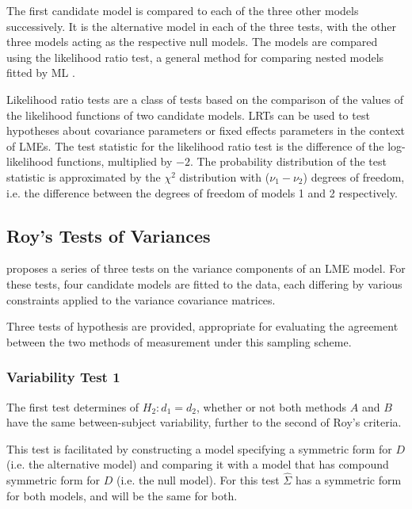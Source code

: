 \documentclass[12pt, a4paper]{report}
\theoremstyle{plain}
\theoremstyle{definition}
\theoremstyle{remark}
\begin{document}
The first candidate model is compared to each of the three other models successively. It is the alternative model in each of the three tests, with the other three models acting as the respective null models. The models are compared using the likelihood ratio test, a general method for comparing nested models fitted by ML \citep{Lehmann2006}.

Likelihood ratio tests are a class of tests based on the comparison of the values of the likelihood functions of two candidate models. LRTs can be used to test hypotheses about covariance parameters or fixed effects parameters in the context of LMEs. The test statistic for the likelihood ratio test is the difference of the log-likelihood functions, multiplied by $-2$.
The probability distribution of the test statistic is approximated by the $\chi^2$ distribution with ($\nu_{1} - \nu_{2}$) degrees of freedom, i.e. the difference between the degrees of freedom of models 1 and 2 respectively. 



\subsection{Roy's Tests of Variances}




\citet{ARoy2009} proposes a series of three tests on the variance components of an LME model. For these tests, four candidate models are fitted to the data, each differing by various constraints applied to the variance covariance matrices. 




Three tests of hypothesis are provided, appropriate for evaluating the agreement between the two methods of measurement under this sampling scheme. 

\subsubsection{Variability Test 1}
The first test determines of $H_{2}: d_{1}  = d_{2}$, whether or not both methods $A$ and $B$ have the same between-subject variability, further to the second of Roy's criteria.

This test is facilitated by constructing a model specifying a symmetric form for $D$ (i.e. the alternative model) and comparing it with a model that has compound symmetric form for $D$ (i.e. the null model). For this test ${\hat{\Sigma}}$ has a symmetric form for both models, and will be the same for both.
\end{document}
